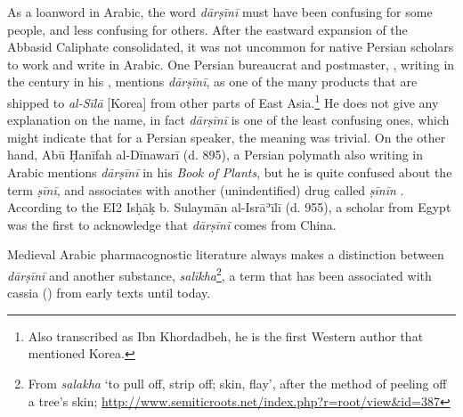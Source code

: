 As a loanword in Arabic, the word \textit{dārṣīnī} must have been confusing for some people, and less confusing for others. After the eastward expansion of the Abbasid Caliphate consolidated, it was not uncommon for native Persian scholars to work and write in Arabic. One Persian bureaucrat and postmaster, \textcite[71]{ibn_khurdadhbih_kitab_870}, writing in the  century in his , mentions \textit{dārṣīnī}, as one of the many products that are shipped to \textit{al-Sīlā} [Korea] from other parts of East Asia.\footnote{Also transcribed as Ibn Khordadbeh, he is the first Western author that mentioned Korea.} He does not give any explanation on the name, in fact \textit{dārṣīnī} is one of the least confusing ones, which might indicate that for a Persian speaker, the meaning was trivial. On the other hand, Abū Ḥanīfah al-Dīnawarī (d. 895), a Persian polymath also writing in Arabic mentions \textit{dārṣīnī} in his \textit{Book of Plants}, but he is quite confused about the term \textit{ṣīnī}, and associates with another (unindentified) drug called \textit{ṣīnīn} \parencite[210]{ad-dinawari_book_1974}. According to the \gls{EI2} Isḥāḳ b. Sulaymān al-Isrāʾīlī (d. 955), a scholar from Egypt was the first to acknowledge that \textit{dārṣīnī} comes from China.



Medieval Arabic pharmacognostic literature always makes a distinction between \textit{dārṣīnī} and another substance, 
\textit{salīkha}\footnote{From \textit{salakha} `to pull off, strip off; skin, flay', after the method of peeling off a tree's skin; \url{http://www.semiticroots.net/index.php?r=root/view&id=387}}, a term that has been associated with cassia () from early texts until today. 

